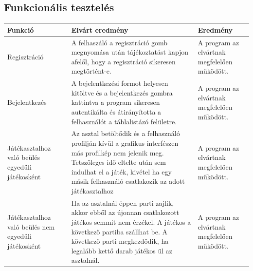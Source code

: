 \subsection{Funkcionális tesztelés}
\begin{tabular}{| C{4.7cm} | C{4.7cm} | C{4.7cm} |}
\hline
  \textbf{Funkció} & \textbf{Elvárt eredmény} & \textbf{Eredmény} \\ \hline
  Regisztráció & A felhaszáló a regisztráció gomb megnyomása után tájékoztatást kapjon afelől, hogy a regisztráció sikeresen megtörtént-e. & A program az elvártnak megfelelően működött. \\ \hline
  Bejelentkezés & A bejelentkezési formot helyesen kitöltve és a bejelentkezés gombra kattintva a program sikeresen autentikálta és átirányította a felhasználót a táblalistázó felületre. & A program az elvártnak megfelelően működött.  \\ \hline
  Játékasztalhoz való beülés egyedüli játékosként & Az asztal betöltődik és a felhasználó profilján kívül a grafikus interfészen más profilkép nem jelenik meg. Tetszőleges idő eltelte után sem indulhat el a játék, kivétel ha egy másik felhasználó csatlakozik az adott játékasztalhoz  & A program az elvártnak megfelelően működött. \\ \hline
  Játékasztalhoz való beülés nem egyedüli játékosként & Ha az asztalnál éppen parti zajlik, akkor ebből az újonnan csatlakozott játékos semmit nem érzékel. A játékos a következő partiba szállhat be. A következő parti megkezdődik, ha legalább kettő darab játékos ül az asztalnál. & A program az elvártnak megfelelően működött. \\ \hline
\end{tabular}

